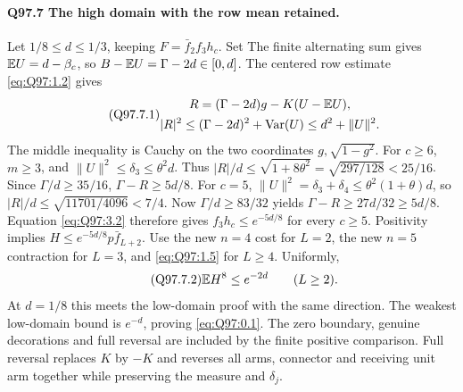 \paragraph{Q97.7 The high domain with the row mean retained.}
Let \(1/8\le\allowbreak  d\le\allowbreak 1/3\), keeping \(F=\allowbreak \bar f_2f_3h_c\). Set
The finite alternating sum gives \(\mathbb E U=\allowbreak d-\beta_c\), so
\(B-\mathbb E U=\allowbreak \Gamma-2d\in[0,\allowbreak d]\).
The centered row estimate \eqref{eq:Q97:1.2} gives
\begin{equation}\tag{Q97.7.1}\label{eq:Q97:7.1}
\begin{gathered}
R=(\Gamma-2d)g-K(U-\mathbb E U),\\
|R|^2\le(\Gamma-2d)^2+\operatorname{Var}(U)\le d^2+\|U\|^2.
\end{gathered}
\end{equation}
The middle inequality is Cauchy on the two coordinates
\(g,\allowbreak \sqrt{1-g^2}\).
For \(c\ge\allowbreak 6\), \(m\ge\allowbreak 3\), and \(\|U\|^2\le\allowbreak \delta_3\le\allowbreak \theta^2d\).
Thus \(|R|/d\le\allowbreak \sqrt{1+8\theta^2}=\allowbreak \sqrt{297/128}<\allowbreak 25/16\).
Since \(\Gamma/d\ge\allowbreak 35/16\), \(\Gamma-R\ge\allowbreak 5d/8\).
For \(c=\allowbreak 5\), \(\|U\|^2=\allowbreak \delta_3+\delta_4\le\allowbreak \theta^2(1+\theta)d\),
so \(|R|/d\le\allowbreak \sqrt{11701/4096}<\allowbreak 7/4\).
Now \(\Gamma/d\ge\allowbreak 83/32\) yields
\(\Gamma-R\ge\allowbreak 27d/32\ge\allowbreak 5d/8\).
Equation \eqref{eq:Q97:3.2} therefore gives \(f_3h_c\le\allowbreak  e^{-5d/8}\)
for every \(c\ge\allowbreak 5\). Positivity implies
\(H\le\allowbreak  e^{-5d/8}p\bar f_{L+2}\).
Use the new \(n=\allowbreak 4\) cost for \(L=\allowbreak 2\), the new \(n=\allowbreak 5\) contraction for
\(L=\allowbreak 3\), and \eqref{eq:Q97:1.5} for \(L\ge\allowbreak 4\). Uniformly,
\begin{equation}\tag{Q97.7.2}\label{eq:Q97:7.2}
\mathbb E H^8\le e^{-2d}\qquad(L\ge2).
\end{equation}
At \(d=\allowbreak 1/8\) this meets the low-domain proof with the same direction.
The weakest low-domain bound is \(e^{-d}\), proving
\eqref{eq:Q97:0.1}. The zero boundary, genuine decorations and full
reversal are included by the finite positive comparison. Full reversal
replaces \(K\) by \(-K\) and reverses all arms, connector and receiving
unit arm together while preserving the measure and \(\delta_j\).

